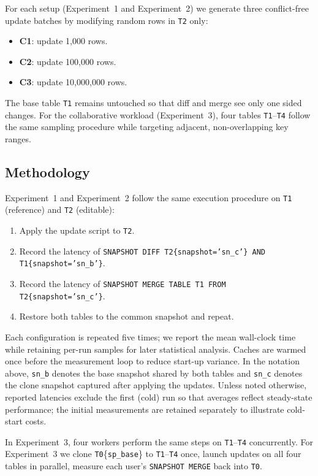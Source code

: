 \documentclass[sigconf,nonacm]{acmart} %
\begin{document}
For each setup (Experiment~1 and Experiment~2) we generate three conflict-free update batches by
modifying random rows in \texttt{T2} only:

\begin{itemize}
\item \textbf{C1}: update 1{,}000 rows.
\item \textbf{C2}: update 100{,}000 rows.
\item \textbf{C3}: update 10{,}000{,}000 rows.
\end{itemize}

The base table \texttt{T1} remains untouched so that diff and merge see
only one sided changes.  For the collaborative workload (Experiment~3), four tables
\texttt{T1}--\texttt{T4} follow the same sampling procedure while targeting
adjacent, non-overlapping key ranges.

\subsection{Methodology}
Experiment~1 and Experiment~2 follow the same execution procedure on
\texttt{T1} (reference) and \texttt{T2} (editable):
\begin{enumerate}
\item Apply the update script to \texttt{T2}.
\item Record the latency of \texttt{SNAPSHOT DIFF
      T2\{snapshot='sn\_c'\} AND T1\{snapshot='sn\_b'\}}.
\item Record the latency of \texttt{SNAPSHOT MERGE TABLE T1 FROM
      T2\{snapshot='sn\_c'\}}.
\item Restore both tables to the common snapshot and repeat.
\end{enumerate}
Each configuration is repeated five times; we report the mean wall-clock
time while retaining per-run samples for later statistical analysis.
Caches are warmed once before the measurement loop to reduce start-up
variance.  In the notation above, \texttt{sn\_b} denotes the base
snapshot shared by both tables and \texttt{sn\_c} denotes the clone
snapshot captured after applying the updates.  Unless noted otherwise,
reported latencies exclude the first (cold) run so that averages reflect
steady-state performance; the initial measurements are retained
separately to illustrate cold-start costs.

In Experiment~3, four workers perform the same steps on \texttt{T1}--\texttt{T4} concurrently. For Experiment~3 we clone \texttt{T0}\{\texttt{sp\_base}\} to \texttt{T1}--\texttt{T4} once,
launch updates on all four tables in parallel, measure each user's \texttt{SNAPSHOT MERGE} back into \texttt{T0}.
\end{document}
